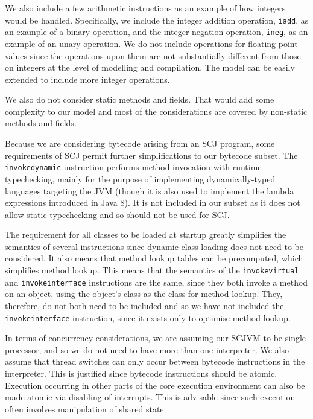 We also include a few arithmetic instructions as an example of how
integers would be handled.
Specifically, we include the integer addition operation,
\texttt{iadd}, as an example of a binary operation, and the integer
negation operation, \texttt{ineg}, as an example of an unary
operation.
We do not include operations for floating point values since the
operations upon them are not substantially different from those on
integers at the level of modelling and compilation.
The model can be easily extended to include more integer operations.

We also do not consider static methods and fields.
That would add some complexity to our model and most of the
considerations are covered by non-static methods and fields.

Because we are considering bytecode arising from an SCJ program, some
requirements of SCJ permit further simplifications to our bytecode
subset.
The \texttt{invokedynamic} instruction performs method invocation with
runtime typechecking, mainly for the purpose of implementing
dynamically-typed languages targeting the JVM (though it is also used
to implement the lambda expressions introduced in Java 8).
It is not included in our subset as it does not allow static
typechecking and so should not be used for SCJ.

The requirement for all classes to be loaded at startup greatly
simplifies the semantics of several instructions since dynamic class
loading does not need to be considered.
It also means that method lookup tables can be precomputed, which
simplifies method lookup.
This means that the semantics of the \texttt{invokevirtual} and
\texttt{invokeinterface} instructions are the same, since they both
invoke a method on an object, using the object's class as the class
for method lookup.
They, therefore, do not both need to be included and so we have not
included the \texttt{invokeinterface} instruction, since it exists
only to optimise method lookup.

In terms of concurrency considerations, we are assuming our SCJVM to
be single processor, and so we do not need to have more than one
interpreter.
We also assume that thread switches can only occur between bytecode
instructions in the interpreter.
This is justified since bytecode instructions should be atomic.
Execution occurring in other parts of the core execution environment
can also be made atomic via disabling of interrupts.
This is advisable since such execution often involves manipulation of
shared state.

